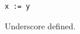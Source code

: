 \documentclass{article}
\begin{document}
\begin{lstlisting}
x := y
\end{lstlisting}
\makeatletter Underscore \ifdefined\underscore@prolog defined\fi.\makeatother
\end{document}
